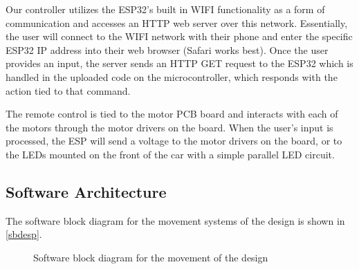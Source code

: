 \documentclass[11pt]{article}
\begin{document}
Our controller utilizes the ESP32’s built in WIFI functionality as a form of communication and accesses an HTTP web server over this network. Essentially, the user will connect to the WIFI network with their phone and enter the specific ESP32 IP address into their web browser (Safari works best). Once the user provides an input, the server sends an HTTP GET request to the ESP32 which is handled in the uploaded code on the microcontroller, which responds with the action tied to that command.  

The remote control is tied to the motor PCB board and interacts with each of the motors through the motor drivers on the board. When the user’s input is processed, the ESP will send a voltage to the motor drivers on the board, or to the LEDs mounted on the front of the car with a simple parallel LED circuit.  

\subsection{Software Architecture}
The software block diagram for the movement systems of the design is shown in \autoref{sbdesp}.
\begin{figure}
    \centering
    \caption{Software block diagram for the movement of the design}
    \label{sbdesp}
\end{figure}
\end{document}
